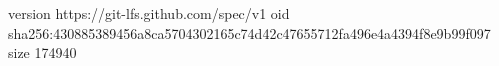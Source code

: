 version https://git-lfs.github.com/spec/v1
oid sha256:430885389456a8ca5704302165c74d42c47655712fa496e4a4394f8e9b99f097
size 174940
